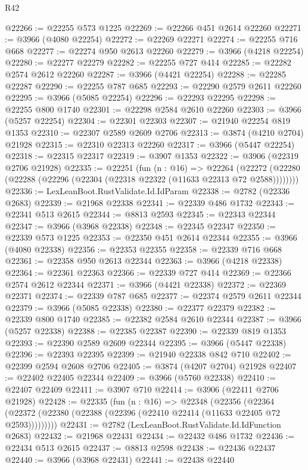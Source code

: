 \begin{lexlean}{R42}
\begin{coremodule}
@22266 := @22255 @573 @1225
@22269 := @22266 @451 @2614 @22260
@22271 := @3966 (@4080 @22254)
@22272 := @22269 @22271
@22274 := @22255 @716 @668
@22277 := @22274 @950 @2613 @22260
@22279 := @3966 (@4218 @22254)
@22280 := @22277 @22279
@22282 := @22255 @727 @414
@22285 := @22282 @2574 @2612 @22260
@22287 := @3966 (@4421 @22254)
@22288 := @22285 @22287
@22290 := @22255 @787 @685
@22293 := @22290 @2579 @2611 @22260
@22295 := @3966 (@5085 @22254)
@22296 := @22293 @22295
@22298 := @22255 @800 @1740
@22301 := @22298 @2584 @2610 @22260
@22303 := @3966 (@5257 @22254)
@22304 := @22301 @22303
@22307 := @21940 @22254 @819 @1353
@22310 := @22307 @2589 @2609 @2706
@22313 := @3874 (@4210 @2704) @21928
@22315 := @22310 @22313 @22260
@22317 := @3966 (@5447 @22254)
@22318 := @22315 @22317
@22319 := @3907 @1353
@22322 := @3906 (@22319 @2706 @21928)
@22335 := @22251
    (fun (n : @16) =>
    @22264 (@22272 (@22280 (@22288 (@22296 (@22304 (@22318 @22322 (@11633 @22313 @72 @2588))))))))
@22336 := LexLeanBoot.RustValidate.Id.IdParam
@22338 := @2782 (@22336 @2683)
@22339 := @21968 @22338
@22341 := @22339 @486 @1732
@22343 := @22341 @513 @2615
@22344 := @8813 @2593
@22345 := @22343 @22344
@22347 := @3966 (@3968 @22338)
@22348 := @22345 @22347
@22350 := @22339 @573 @1225
@22353 := @22350 @451 @2614 @22344
@22355 := @3966 (@4080 @22338)
@22356 := @22353 @22355
@22358 := @22339 @716 @668
@22361 := @22358 @950 @2613 @22344
@22363 := @3966 (@4218 @22338)
@22364 := @22361 @22363
@22366 := @22339 @727 @414
@22369 := @22366 @2574 @2612 @22344
@22371 := @3966 (@4421 @22338)
@22372 := @22369 @22371
@22374 := @22339 @787 @685
@22377 := @22374 @2579 @2611 @22344
@22379 := @3966 (@5085 @22338)
@22380 := @22377 @22379
@22382 := @22339 @800 @1740
@22385 := @22382 @2584 @2610 @22344
@22387 := @3966 (@5257 @22338)
@22388 := @22385 @22387
@22390 := @22339 @819 @1353
@22393 := @22390 @2589 @2609 @22344
@22395 := @3966 (@5447 @22338)
@22396 := @22393 @22395
@22399 := @21940 @22338 @842 @710
@22402 := @22399 @2594 @2608 @2706
@22405 := @3874 (@4207 @2704) @21928
@22407 := @22402 @22405 @22344
@22409 := @3966 (@5760 @22338)
@22410 := @22407 @22409
@22411 := @3907 @710
@22414 := @3906 (@22411 @2706 @21928)
@22428 := @22335
    (fun (n : @16) =>
    @22348
      (@22356
        (@22364 (@22372 (@22380 (@22388 (@22396 (@22410 @22414 (@11633 @22405 @72 @2593)))))))))
@22431 := @2782 (LexLeanBoot.RustValidate.Id.IdFunction @2683)
@22432 := @21968 @22431
@22434 := @22432 @486 @1732
@22436 := @22434 @513 @2615
@22437 := @8813 @2598
@22438 := @22436 @22437
@22440 := @3966 (@3968 @22431)
@22441 := @22438 @22440

\end{coremodule}
\end{lexlean}

